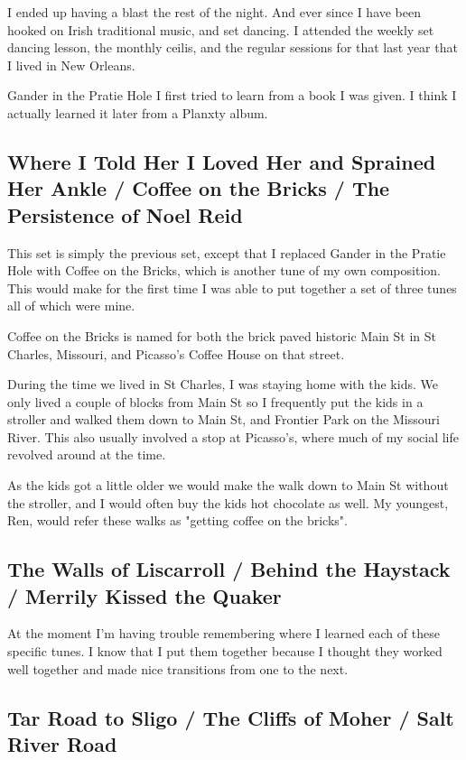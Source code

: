 \documentclass[11pt,letterpaper]{article}
\begin{document}
I ended up having a blast the rest of the night. And ever since I have been hooked on Irish traditional music, and set dancing. I attended the weekly set dancing lesson, the monthly ceilis, and the regular sessions for that last year that I lived in New Orleans. 

Gander in the Pratie Hole I first tried to learn from a book I was given. I think I actually learned it later from a Planxty album. 

\subsection*{Where I Told Her I Loved Her and Sprained Her Ankle / Coffee on the Bricks / The Persistence of Noel Reid}

This set is simply the previous set, except that I replaced Gander in the Pratie Hole with Coffee on the Bricks, which is another tune of my own composition. This would make for the first time I was able to put together a set of three tunes all of which were mine. 

Coffee on the Bricks is named for both the brick paved historic Main St in St Charles, Missouri, and Picasso's Coffee House on that street. 

During the time we lived in St Charles, I was staying home with the kids. We only lived a couple of blocks from Main St so I frequently put the kids in a stroller and walked them down to Main St, and Frontier Park on the Missouri River. This also usually involved a stop at Picasso's, where much of my social life revolved around at the time. 

As the kids got a little older we would make the walk down to Main St without the stroller, and I would often buy the kids hot chocolate as well. My youngest, Ren, would refer these walks as "getting coffee on the bricks".

\subsection*{The Walls of Liscarroll / Behind the Haystack / Merrily Kissed the Quaker}

At the moment I'm having trouble remembering where I learned each of these specific tunes. I know that I put them together because I thought they worked well together and made nice transitions from one to the next. 

\subsection*{Tar Road to Sligo / The Cliffs of Moher / Salt River Road}
\end{document}
